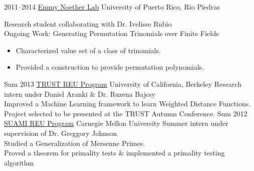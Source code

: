 \documentclass[]{friggeri-cv}
\begin{document}
\begin{entrylist}
\entry
{2011--2014}
{\href{http://ccom.uprrp.edu/~labemmy/?page_id=868}{Emmy Noether Lab}}
{University of Puerto Rico, Rio Piedras}
{Research student collaborating with Dr. Ivelisse Rubio \\
Ongoing Work: Generating Permutation Trinomials over Finite Fields
\begin{itemize}
\item Characterized value set of a class of trinomials.
\item Provided a construction to provide permutation polynomials.
\end{itemize}}
\entry
{Sum 2013}
{\href{https://www.truststc.org/education/reu/13/index.html}{TRUST REU Program}}
{University of California, Berkeley}
{Research intern under Daniel Aranki \& Dr. Ruzena Bajcsy \\
Improved a Machine Learning framework to learn Weighted Distance Functions. \\
Project selected to be presented at the TRUST Autumn Conference.}
\entry
{Sum 2012}
{\href{http://www.math.cmu.edu/cna/summer_institute.html}{SUAMI REU Program}}
{Carnegie Mellon University}
{Summer intern under supervision of Dr. Greggory Johnson\\
Studied a Generalization of Mersenne Primes. \\
Proved a theorem for primality tests \& implemented a primality testing algorithm}
\end{entrylist}

\end{document}
